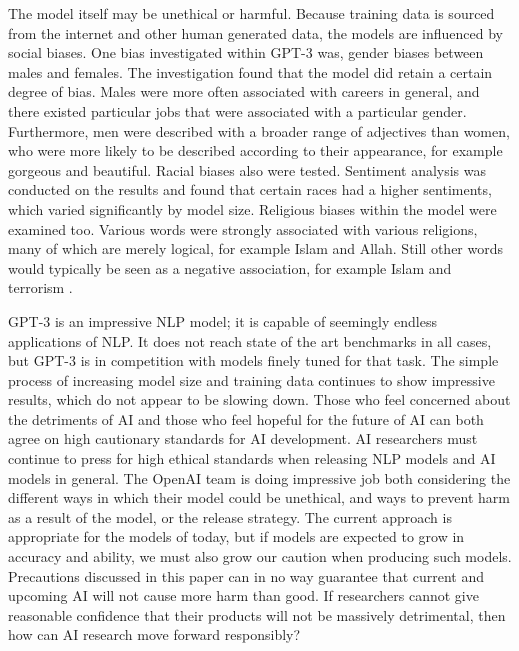 \documentclass[12pt]{article}
\begin{document}
The model itself may be unethical or harmful. Because training data is sourced
from the internet and other human generated data, the models are influenced by
social biases. One bias investigated within GPT-3 was, gender biases between
males and females. The investigation found that the model did retain a certain
degree of bias. Males were more often associated with careers in general, and
there existed particular jobs that were associated with a particular gender.
Furthermore, men were described with a broader range of adjectives than women,
who were more likely to be described according to their appearance, for example
gorgeous and beautiful. Racial biases also were tested. Sentiment analysis was
conducted on the results and found that certain races had a higher sentiments,
which varied significantly by model size.  Religious biases within the model
were examined too. Various words were strongly associated with various
religions, many of which are merely logical, for example Islam and Allah. Still
other words would typically be seen as a negative association, for example
Islam and terrorism \cite{brown20}.

GPT-3 is an impressive NLP model; it is capable of seemingly endless
applications of NLP. It does not reach state of the art benchmarks in all
cases, but GPT-3 is in competition with models finely tuned for that task. The
simple process of increasing model size and training data continues to show
impressive results, which do not appear to be slowing down. Those who feel
concerned about the detriments of AI and those who feel hopeful for the future
of AI can both agree on high cautionary standards for AI development. AI
researchers must continue to press for high ethical standards when releasing
NLP models and AI models in general. The OpenAI team is doing impressive job
both considering the different ways in which their model could be unethical,
and ways to prevent harm as a result of the model, or the release strategy. The
current approach is appropriate for the models of today, but if models are
expected to grow in accuracy and ability, we must also grow our caution when
producing such models. Precautions discussed in this paper can in no way
guarantee that current and upcoming AI will not cause more harm than good. If
researchers cannot give reasonable confidence that their products will not be
massively detrimental, then how can AI research move forward responsibly? 
\end{document}
